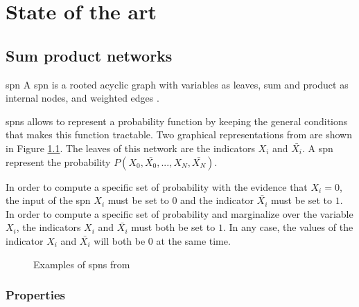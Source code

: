 
\chapter{State of the art}
\label{cha:soa}

\section{Sum product networks}

\begin{definition}{\Gls{spn}}
A \gls{spn} is a rooted acyclic graph with variables as leaves, sum and product as internal nodes, and weighted edges \cite{spns}.
\end{definition}

\Glspl{spn} allows to represent a probability function by keeping the general conditions that makes this function tractable. Two graphical representations from \cite{spns} are shown in Figure \ref{fig:spn_example}. The leaves of this network are the indicators $X_i$ and $\bar{X_i}$. A \gls{spn} represent the probability $P(X_0, \bar{X_0}, ...,  X_N, \bar{X_N})$.

In order to compute a specific set of probability with the evidence that $X_i=0$, the input of the \gls{spn} $X_i$ must be set to $0$ and the indicator $\bar{X_i}$ must be set to $1$. In order to compute a specific set of probability and marginalize over the variable $X_i$, the indicators $X_i$ and $\bar{X_i}$ must both be set to $1$. In any case, the values of the indicator $X_i$ and $\bar{X_i}$ will  both be $0$ at the same time.

\begin{figure}[!ht]
\begin{mdframed}
	
	
	\caption{Examples of \glspl{spn} from \cite{spns}}
	\label{fig:spn_example}
\end{mdframed}
\end{figure}

\subsection{Properties}

